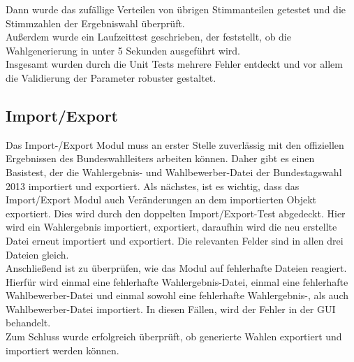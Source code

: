 \documentclass[12pt,a4paper,titlepage]{article}
\begin{document}
Dann wurde das zufällige Verteilen von übrigen Stimmanteilen getestet und die Stimmzahlen der Ergebniswahl überprüft.\\

Außerdem wurde ein Laufzeittest geschrieben, der feststellt, ob die Wahlgenerierung in unter 5 Sekunden ausgeführt wird.\\

Insgesamt wurden durch die Unit Tests mehrere Fehler entdeckt und vor allem die Validierung der Parameter robuster gestaltet.

\subsection{Import/Export}
Das Import-/Export Modul muss an erster Stelle zuverlässig mit den offiziellen Ergebnissen des Bundeswahlleiters arbeiten können. Daher gibt es einen Basistest, der die Wahlergebnis- und Wahlbewerber-Datei der Bundestagswahl 2013 importiert und exportiert.
Als nächstes, ist es wichtig, dass das Import/Export Modul auch Veränderungen an dem importierten Objekt exportiert. Dies wird durch den doppelten Import/Export-Test abgedeckt. Hier wird ein Wahlergebnis importiert, exportiert, daraufhin wird die neu erstellte Datei erneut importiert und exportiert. Die relevanten Felder sind in allen drei Dateien gleich. \\

Anschließend ist zu überprüfen, wie das Modul auf fehlerhafte Dateien reagiert. Hierfür wird einmal eine fehlerhafte Wahlergebnis-Datei, einmal eine fehlerhafte Wahlbewerber-Datei und einmal sowohl eine fehlerhafte Wahlergebnis-, als auch Wahlbewerber-Datei importiert. In diesen Fällen, wird der Fehler in der GUI behandelt. \\

Zum Schluss wurde erfolgreich überprüft, ob generierte Wahlen exportiert und importiert werden können. 
\end{document}
